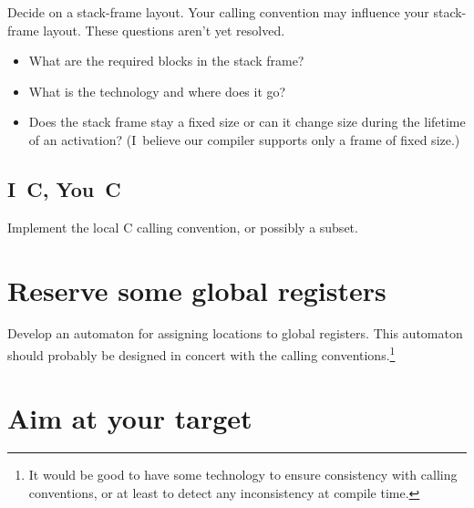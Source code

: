 \documentclass[12pt]{article}
\begin{document}
Decide on a stack-frame layout.
Your calling convention may influence your stack-frame layout.
These questions aren't yet resolved.
\begin{itemize}
\item
What are the required blocks in the stack frame?
\item
What is the technology and where does it go?
\item
Does the stack frame stay a fixed size or can it change size during
the lifetime of an activation? 
(I~believe our compiler supports only a frame of fixed size.)
\end{itemize}


\subsection{I~C, You~C}

Implement the local C calling convention, or possibly a subset.


\section{Reserve some global registers}

Develop an automaton for assigning locations to global registers.
This automaton should probably be designed in concert with the calling
conventions.\footnote
{It would be good to have some technology to ensure consistency with
calling conventions, or at least to detect any inconsistency at
compile time.}


\section{Aim at your target}
\end{document}
